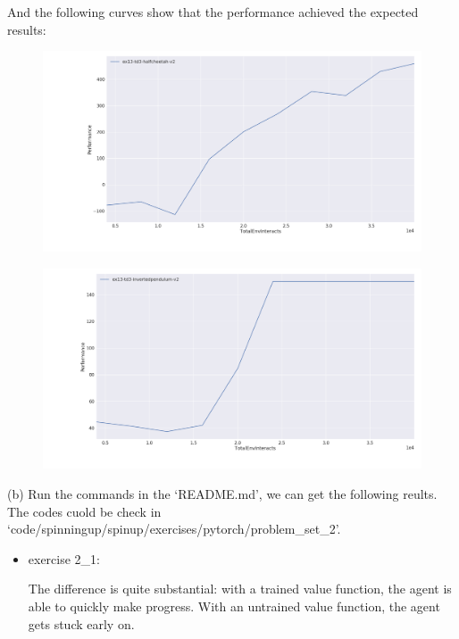 \begin{homeworkProblem}
\begin{itemize}
    And the following curves show that the performance achieved the expected results:
    \begin{figure}[H]
        \centering
        \includegraphics[width=\textwidth]{../Img/spinningup_exercises/1_3_healthcare.png}
        \vspace{-2cm}
    \end{figure}
    \begin{figure}[H]
        \centering
        \includegraphics[width=\textwidth]{../Img/spinningup_exercises/1_3_invertedpendulum.png}
    \end{figure}

\end{itemize}


(b) Run the commands in the `README.md', we can get the following reults. The codes cuold be check in `code/spinningup/spinup/exercises/pytorch/problem\_set\_2'.

\begin{itemize}
    \item exercise 2\_1:

    The difference is quite substantial: with a trained value function, the agent is able to quickly make progress. With an untrained value function, the agent gets stuck early on.


\end{itemize}
\end{homeworkProblem}
